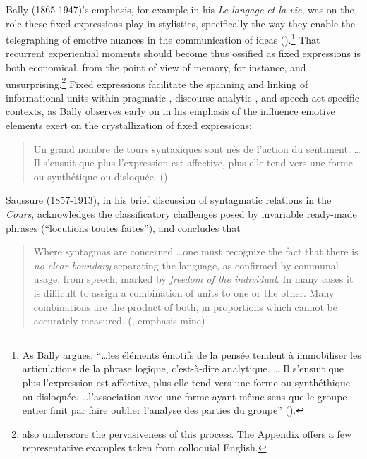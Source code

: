 \documentclass[output=paper]{langsci/langscibook}
\begin{document}
Bally (1865-1947)’s emphasis, for example in his \textit{Le langage et la vie}, was on the role these fixed expressions play in stylistics, specifically the way they enable the telegraphing of emotive nuances in the communication of ideas (\citeyear[141]{bally__langage_1952}).\footnote{ \textrm{As Bally argues, “…les éléments émotifs de la pensée tendent à immobiliser les articulations de la phrase logique, c’est-à-dire analytique. … Il s’ensuit que plus l’expression est affective, plus elle tend vers une forme ou synthéthique ou disloquée. …l’association avec une forme ayant même sens que le groupe entier finit par faire oublier l’analyse des parties du groupe” (\citeyear[68]{bally__langage_1952}).} } That recurrent experiential moments should become thus ossified as fixed expressions is both economical, from the point of view of memory, for instance, and unsurprising.\footnote{\citet[191]{richards_two_1983} also underscore the pervasiveness of this process. The Appendix offers a few representative examples taken from colloquial English.} Fixed expressions facilitate the spanning and linking of informational units within pragmatic-, discourse analytic-, and speech act-specific contexts, as Bally observes early on in his emphasis of the influence emotive elements exert on the crystallization of fixed expressions: 

\begin{quote}
    Un grand nombre de tours syntaxiques sont nés de l’action du sentiment. …Il s’ensuit que plus l’expression est affective, plus elle tend vers une forme ou synthétique ou disloquée. (\citeyear[68]{bally__langage_1952})
\end{quote}

Saussure (1857-1913), in his brief discussion of syntagmatic relations in the \textit{Cours}, acknowledges the classificatory challenges posed by invariable ready-made phrases (“locutions toutes faites”), and concludes that

\begin{quote}
    Where syntagmas are concerned …one must recognize the fact that there is \textit{no clear boundary} separating the language, as confirmed by communal usage, from speech, marked by \textit{freedom of the individual}. In many cases it is difficult to assign a combination of units to one or the other. Many combinations are the product of both, in proportions which cannot be accurately measured. (\citeyear[123]{saussure_cours_1986}, emphasis mine)
\end{quote}
\end{document}

